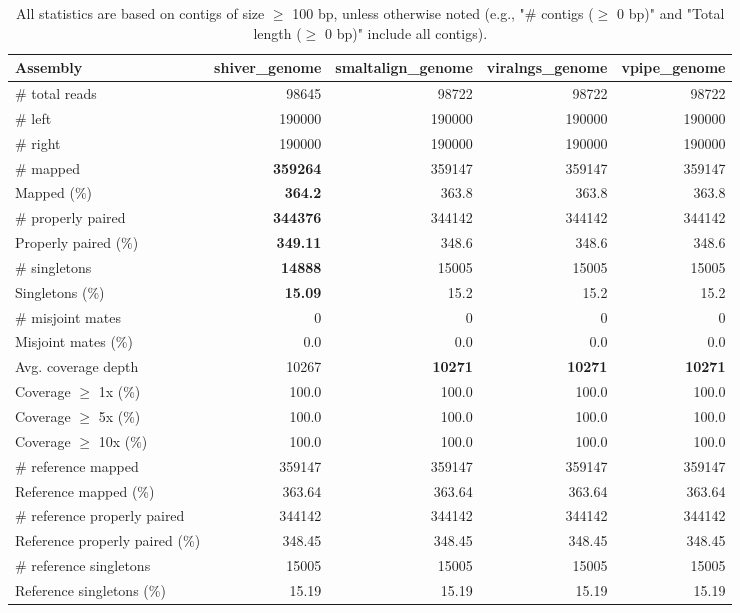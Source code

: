 \documentclass[12pt,a4paper]{article}
\begin{document}
\begin{table}[ht]
\begin{center}
\caption{All statistics are based on contigs of size $\geq$ 100 bp, unless otherwise noted (e.g., "\# contigs ($\geq$ 0 bp)" and "Total length ($\geq$ 0 bp)" include all contigs).}
\begin{tabular}{|l*{4}{|r}|}
\hline
Assembly & shiver\_genome & smaltalign\_genome & viralngs\_genome & vpipe\_genome \\ \hline
\# total reads & 98645 & 98722 & 98722 & 98722 \\ \hline
\# left & 190000 & 190000 & 190000 & 190000 \\ \hline
\# right & 190000 & 190000 & 190000 & 190000 \\ \hline
\# mapped & {\bf 359264} & 359147 & 359147 & 359147 \\ \hline
Mapped (\%) & {\bf 364.2} & 363.8 & 363.8 & 363.8 \\ \hline
\# properly paired & {\bf 344376} & 344142 & 344142 & 344142 \\ \hline
Properly paired (\%) & {\bf 349.11} & 348.6 & 348.6 & 348.6 \\ \hline
\# singletons & {\bf 14888} & 15005 & 15005 & 15005 \\ \hline
Singletons (\%) & {\bf 15.09} & 15.2 & 15.2 & 15.2 \\ \hline
\# misjoint mates & 0 & 0 & 0 & 0 \\ \hline
Misjoint mates (\%) & 0.0 & 0.0 & 0.0 & 0.0 \\ \hline
Avg. coverage depth & 10267 & {\bf 10271} & {\bf 10271} & {\bf 10271} \\ \hline
Coverage $\geq$ 1x (\%) & 100.0 & 100.0 & 100.0 & 100.0 \\ \hline
Coverage $\geq$ 5x (\%) & 100.0 & 100.0 & 100.0 & 100.0 \\ \hline
Coverage $\geq$ 10x (\%) & 100.0 & 100.0 & 100.0 & 100.0 \\ \hline
\# reference mapped & 359147 & 359147 & 359147 & 359147 \\ \hline
Reference mapped (\%) & 363.64 & 363.64 & 363.64 & 363.64 \\ \hline
\# reference properly paired & 344142 & 344142 & 344142 & 344142 \\ \hline
Reference properly paired (\%) & 348.45 & 348.45 & 348.45 & 348.45 \\ \hline
\# reference singletons & 15005 & 15005 & 15005 & 15005 \\ \hline
Reference singletons (\%) & 15.19 & 15.19 & 15.19 & 15.19 \\ \hline

\end{tabular}
\end{center}
\end{table}
\end{document}
